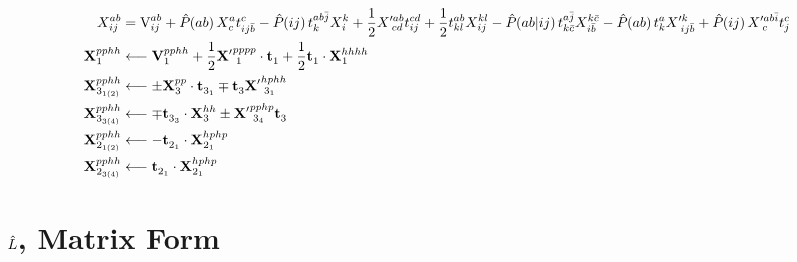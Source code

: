 \documentclass[thesis.tex]{subfiles}
\begin{document}
\begin{align}
  \xint{ab}{ij} &= \vint{ab}{ij} + \Perm{ab}\xint{a}{c}\tamp{c}{ij\bar{b}} - \Perm{ij}\tamp{ab\bar{j}}{k}\xint{k}{i} + \frac{1}{2}\xxint{ab}{cd}\tamp{cd}{ij} + \frac{1}{2}\tamp{ab}{kl}\xint{kl}{ij} - \Perm{ab|ij}\tamp{a\bar{j}}{k\bar{c}}\xint{k\bar{c}}{i\bar{b}} - \Perm{ab}\tamp{a}{k}\xxint{k}{ij\bar{b}} + \Perm{ij}\xxint{ab\bar{i}}{c}\tamp{c}{j} \notag \\
  \bxint{pphh}{1} &\longleftarrow \bvint{pphh}{1} + \frac{1}{2}\bxxint{pppp}{1}\cdot\btamp{}{1} + \frac{1}{2}\btamp{}{1}\cdot\bxint{hhhh}{1} \notag \\
  \bxint{pphh}{3_{1(2)}} &\longleftarrow \pm\bxint{pp}{3}\cdot\btamp{}{3_{1}} \mp\btamp{}{3}\bxxint{hphh}{3_{1}} \notag \\
  \bxint{pphh}{3_{3(4)}} &\longleftarrow \mp\btamp{}{3_{3}}\cdot\bxint{hh}{3} \pm\bxxint{pphp}{3_{4}}\btamp{}{3} \notag \\
  \bxint{pphh}{2_{1(2)}} &\longleftarrow -\btamp{}{2_{1}}\cdot\bxint{hphp}{2_{1}} \notag \\
  \bxint{pphh}{2_{3(4)}} &\longleftarrow \btamp{}{2_{1}}\cdot\bxint{hphp}{2_{1}}
\end{align}


\section{$\Lop$, Matrix Form}
\end{document}
